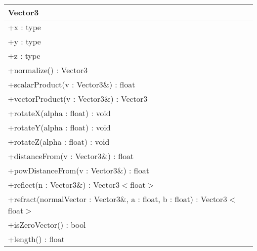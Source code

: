 \begin{center}
    \begin{tabular}{|l|}
    \hline
    Vector3 \\ \hline
    +x : type \\
    +y : type \\
    +z : type \\
     \hline
	+normalize() : Vector3 \\ 
	+scalarProduct(v : Vector3\&) : float \\
	+vectorProduct(v : Vector3\&) : Vector3 \\
	+rotateX(alpha : float) : void \\
	+rotateY(alpha : float) : void \\
	+rotateZ(alpha : float) : void \\
	+distanceFrom(v : Vector3\&) : float \\
	+powDistanceFrom(v : Vector3\&) : float \\
	+reflect(n : Vector3\&) : Vector3$<$float$>$ \\
	+refract(normalVector : Vector3\&, a : float, b : float) : Vector3$<$float$>$ \\
	+isZeroVector() : bool \\
	+length() : float \\
	\hline
    \end{tabular}
\end{center}


